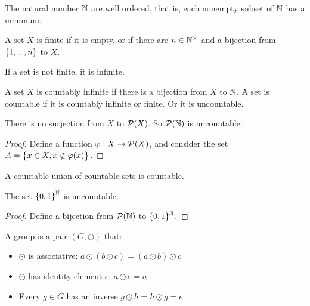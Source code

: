 \begin{theorem}
    The natural number $\mathbb{N}$ are well ordered, that is, each nonempty subset of $\mathbb{N}$ has a minimum.
\end{theorem}


\begin{definition}
    A set $X$ is finite if it is empty, or if there are $n \in \mathbb{N}^{\times}$ and a bijection from $\set{1, ..., n}$ to $X$.
    
    If a set is not finite, it is infinite.
    
    A set $X$ is countably infinite if there is a bijection from $X$ to $\mathbb{N}$. A set is countable if it is countably infinite or finite. Or it is uncountable.
\end{definition}

\begin{theorem}
    There is no surjection from $X$ to $\mathcal{P}(X)$. So $\mathcal{P}(\mathbb{N})$ is uncountable.
\end{theorem}
\begin{proof}
    Define a function $\varphi: X \rightarrow \mathcal{P}(X)$, and consider the set $A = \set{x\in X, x \notin \varphi(x)}$.
\end{proof}


\begin{theorem}
A countable union of countable sets is countable.    
\end{theorem}

\begin{theorem}
The set $\set{0,1}^{\mathbb{N}}$ is uncountable.
\end{theorem}
\begin{proof}
    Define a bijection from $\mathcal{P}(\mathbb{N})$ to $\set{0,1}^{\mathbb{N}}$.
\end{proof}


\begin{definition}[group]
    A group is a pair $(G, \odot)$ that:
    \begin{itemize}
        \item $\odot$ is associative: $a \odot (b \odot c) = (a \odot b) \odot c $
        \item $\odot$ has identity element $e$: $a \odot e = a$
        \item Every $g \in G$ has an inverse $g \odot h = h \odot g = e$
    \end{itemize}
\end{definition}


